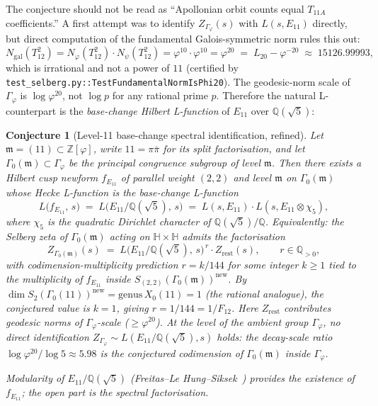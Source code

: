 \documentclass[11pt,a4paper]{article}
\theoremstyle{plain}
\newtheorem{conjecture}[theorem]{Conjecture}
\theoremstyle{definition}
\theoremstyle{remark}
\numberwithin{equation}{section}
\providecommand{\Zp}{\ensuremath{\mathbb{Z}[\varphi]}}
\providecommand{\Qp}{\ensuremath{\mathbb{Q}(\sqrt{5})}}
\providecommand{\Gphi}{\ensuremath{\Gamma_{\varphi}}}
\begin{document}
The conjecture should not be read as ``Apollonian orbit counts equal $T_{11A}$ coefficients.''
A first attempt was to identify $Z_{\Gphi}(s)$ with $L(s,E_{11})$ directly, but
direct computation of the fundamental Galois-symmetric norm rules this out:
\begin{equation}\label{eq:fundamental-norm}
  N_{\mathrm{gal}}(T_{12}^{2})
  = N_{\varphi}(T_{12}^{2})\cdot N_{\psi}(T_{12}^{2})
  = \varphi^{10}\cdot\varphi^{10}
  = \varphi^{20}
  \;=\; L_{20} - \varphi^{-20}
  \;\approx\; 15126.99993,
\end{equation}
which is irrational and not a power of $11$
(certified by \texttt{test\_selberg.py::TestFundamentalNormIsPhi20}).
The geodesic-norm scale of $\Gphi$ is $\log\varphi^{20}$, not $\log p$ for any
rational prime $p$.  Therefore the natural L-counterpart is the
\emph{base-change Hilbert L-function} of $E_{11}$ over $\Qp$:
\begin{conjecture}[Level-11 base-change spectral identification, refined]\label{conj:spectral}
  Let $\mathfrak{m}=(11)\subset\Zp$, write $11=\pi\bar\pi$ for its split
  factorisation, and let $\Gamma_{0}(\mathfrak{m})\subset\Gphi$ be the principal
  congruence subgroup of level $\mathfrak{m}$.  Then there exists a Hilbert
  cusp newform $f_{E_{11}}$ of parallel weight $(2,2)$ and level $\mathfrak{m}$
  on $\Gamma_{0}(\mathfrak{m})$ whose Hecke L-function is the base-change
  L-function
  \[
    L\bigl(f_{E_{11}},\,s\bigr)
    \;=\;L\bigl(E_{11}/\Qp,\,s\bigr)
    \;=\; L(s,E_{11})\cdot L(s,E_{11}\otimes\chi_{5}),
  \]
  where $\chi_{5}$ is the quadratic Dirichlet character of $\Qp/\mathbb Q$.
  Equivalently: the Selberg zeta of $\Gamma_{0}(\mathfrak{m})$ acting on
  $\mathbb H\times\mathbb H$ admits the factorisation
  \[
    Z_{\Gamma_{0}(\mathfrak{m})}(s)\;=\;L\bigl(E_{11}/\Qp,\,s\bigr)^{\,r}\cdot Z_{\mathrm{rest}}(s),
    \qquad r\in\mathbb{Q}_{>0},
  \]
  with codimension-multiplicity prediction $r = k/144$ for some integer
  $k\ge 1$ tied to the multiplicity of $f_{E_{11}}$ inside $S_{(2,2)}(\Gamma_{0}(\mathfrak m))^{\mathrm{new}}$.
  By $\dim S_{2}(\Gamma_{0}(11))^{\mathrm{new}}=\mathrm{genus}\,X_{0}(11)=1$
  (the rational analogue), the conjectured value is $k=1$, giving $r=1/144=1/F_{12}$.
  Here $Z_{\mathrm{rest}}$ contributes geodesic norms of
  $\Gphi$-scale ($\geq\varphi^{20}$).  At the level of the \emph{ambient}
  group $\Gphi$, no direct identification $Z_{\Gphi}\sim L(E_{11}/\Qp,s)$ holds:
  the decay-scale ratio $\log\varphi^{20}/\log 5\approx 5.98$ is the
  conjectured codimension of $\Gamma_{0}(\mathfrak{m})$ inside $\Gphi$.

  Modularity of $E_{11}/\Qp$ (Freitas--Le Hung--Siksek~\cite{FLHS2015}) provides
  the existence of $f_{E_{11}}$; the open part is the spectral factorisation.
\end{conjecture}
\end{document}
